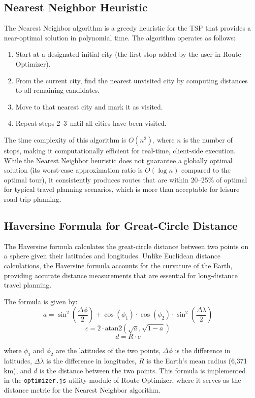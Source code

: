 \subsection{Nearest Neighbor Heuristic}
The Nearest Neighbor algorithm is a greedy heuristic for the TSP that provides a near-optimal solution in polynomial time. The algorithm operates as follows:
\begin{enumerate}
    \item Start at a designated initial city (the first stop added by the user in Route Optimizer).
    \item From the current city, find the nearest unvisited city by computing distances to all remaining candidates.
    \item Move to that nearest city and mark it as visited.
    \item Repeat steps 2--3 until all cities have been visited.
\end{enumerate}

The time complexity of this algorithm is $O(n^2)$, where $n$ is the number of stops, making it computationally efficient for real-time, client-side execution. While the Nearest Neighbor heuristic does not guarantee a globally optimal solution (its worst-case approximation ratio is $O(\log n)$ compared to the optimal tour), it consistently produces routes that are within 20--25\% of optimal for typical travel planning scenarios, which is more than acceptable for leisure road trip planning.

\subsection{Haversine Formula for Great-Circle Distance}
The Haversine formula calculates the great-circle distance between two points on a sphere given their latitudes and longitudes. Unlike Euclidean distance calculations, the Haversine formula accounts for the curvature of the Earth, providing accurate distance measurements that are essential for long-distance travel planning.

The formula is given by:
\[
a = \sin^2\left(\frac{\Delta\phi}{2}\right) + \cos(\phi_1) \cdot \cos(\phi_2) \cdot \sin^2\left(\frac{\Delta\lambda}{2}\right)
\]
\[
c = 2 \cdot \text{atan2}\left(\sqrt{a}, \sqrt{1-a}\right)
\]
\[
d = R \cdot c
\]

where $\phi_1$ and $\phi_2$ are the latitudes of the two points, $\Delta\phi$ is the difference in latitudes, $\Delta\lambda$ is the difference in longitudes, $R$ is the Earth's mean radius (6,371 km), and $d$ is the distance between the two points. This formula is implemented in the \texttt{optimizer.js} utility module of Route Optimizer, where it serves as the distance metric for the Nearest Neighbor algorithm.

